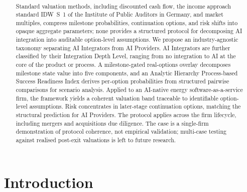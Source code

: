\documentclass[oneside,10pt]{swissi}
\title{\papertitle \\[0.35em]
\normalsize \papersubtitle}
\author{{\fontsize{8}{10}\selectfont\paperauthors}\\[0.9em]
{\scriptsize\paperaffiliations}}
\date{\vspace{1.5em}}
\begin{document}
\maketitle

\begin{abstract}
Standard valuation methods, including discounted cash flow, the income approach standard IDW~S~1 of the Institute of Public Auditors in Germany, and market multiples, compress milestone probabilities, continuation options, and risk shifts into opaque aggregate parameters; none provides a structured protocol for decomposing AI integration into auditable option-level assumptions. We propose an industry-agnostic taxonomy separating AI Integrators from AI Providers. AI Integrators are further classified by their Integration Depth Level, ranging from no integration to AI at the core of the product or process. A milestone-gated real-options overlay decomposes milestone state value into five components, and an Analytic Hierarchy Process-based Success Readiness Index derives per-option probabilities from structured pairwise comparisons for scenario analysis. Applied to an AI-native energy software-as-a-service firm, the framework yields a coherent valuation band traceable to identifiable option-level assumptions. Risk concentrates in later-stage continuation options, matching the structural prediction for AI Providers. The protocol applies across the firm lifecycle, including mergers and acquisitions due diligence. The case is a single-firm demonstration of protocol coherence, not empirical validation; multi-case testing against realised post-exit valuations is left to future research.
\end{abstract}


\section{Introduction}
\end{document}
